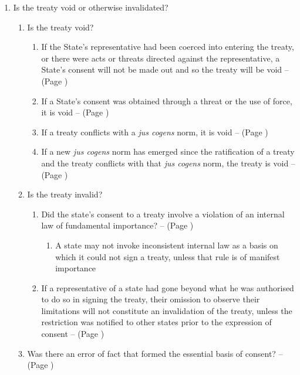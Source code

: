 \begin{enumerate}
    \item Is the treaty void or otherwise invalidated?
    \begin{enumerate}
        \item Is the treaty void?
        \begin{enumerate}
            \item If the State's representative had been coerced into entering the treaty, or there were acts or threats directed against the representative, a State's consent will not be made out and so the treaty will be void --  (Page \pageref{VCLT Art 51})
            \item If a State's consent was obtained through a threat or the use of force, it is void --  (Page \pageref{VCLT Art 52})
            \item If a treaty conflicts with a \textit{jus cogens} norm, it is void --  (Page \pageref{VCLT Art 53})
            \item If a new \textit{jus cogens} norm has emerged since the ratification of a treaty and the treaty conflicts with that \textit{jus cogens} norm, the treaty is void --  (Page \pageref{VCLT Art 64})
        \end{enumerate}
        \item Is the treaty invalid?
        \begin{enumerate}
            \item Did the state's consent to a treaty involve a violation of an internal law of fundamental importance? --  (Page \pageref{VCLT Art 46})
            \begin{enumerate}
                \item A state may not invoke inconsistent internal law as a basis on which it could not sign a treaty, unless that rule is of manifest importance
            \end{enumerate}
            \item If a representative of a state had gone beyond what he was authorised to do so in signing the treaty, their omission to observe their limitations will not constitute an invalidation of the treaty, unless the restriction was notified to other states prior to the expression of consent --  (Page \pageref{VCLT Art 47})
        \end{enumerate}
        \item Was there an error of fact that formed the essential basis of consent? --  (Page \pageref{VCLT Art 48})

\end{enumerate}
\end{enumerate}
